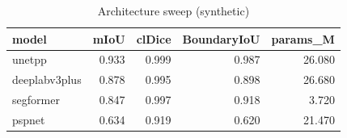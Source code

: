 \begin{table}
\caption{Architecture sweep (synthetic)}
\begin{tabular}{lrrrr}
\toprule
model & mIoU & clDice & BoundaryIoU & params_M \\
\midrule
unetpp & 0.933 & 0.999 & 0.987 & 26.080 \\
deeplabv3plus & 0.878 & 0.995 & 0.898 & 26.680 \\
segformer & 0.847 & 0.997 & 0.918 & 3.720 \\
pspnet & 0.634 & 0.919 & 0.620 & 21.470 \\
\bottomrule
\end{tabular}
\end{table}
